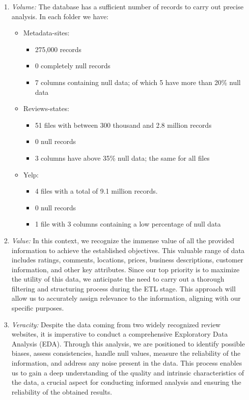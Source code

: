 \documentclass[12pt]{article}
\begin{document}
\begin{enumerate}
\begin{enumerate}
        \item \textit{Volume:} The database has a sufficient number of records to carry out precise analysis. In each folder we have:
        \begin{itemize}
            \item Metadata-sites:
            \begin{itemize}
                \item 275,000 records
                \item 0 completely null records
                \item 7 columns containing null data; of which 5 have more than 20\% null data
            \end{itemize}
            \item Reviews-states:
            \begin{itemize}
                \item 51 files with between 300 thousand and 2.8 million records
                \item 0 null records
                \item 3 columns have above 35\% null data; the same for all files
            \end{itemize}
            \item Yelp:
            \begin{itemize}
                \item 4 files with a total of 9.1 million records.
                \item 0 null records
                \item 1 file with 3 columns containing a low percentage of null data
            \end{itemize}
        \end{itemize}
        
        \item \textit{Value:} In this context, we recognize the immense value of all the provided information to achieve the established objectives. This valuable range of data includes ratings, comments, locations, prices, business descriptions, customer information, and other key attributes. Since our top priority is to maximize the utility of this data, we anticipate the need to carry out a thorough filtering and structuring process during the ETL stage. This approach will allow us to accurately assign relevance to the information, aligning with our specific purposes.
        
        \item \textit{Veracity:} Despite the data coming from two widely recognized review websites, it is imperative to conduct a comprehensive Exploratory Data Analysis (EDA). Through this analysis, we are positioned to identify possible biases, assess consistencies, handle null values, measure the reliability of the information, and address any noise present in the data. This process enables us to gain a deep understanding of the quality and intrinsic characteristics of the data, a crucial aspect for conducting informed analysis and ensuring the reliability of the obtained results.
    \end{enumerate}
\end{enumerate}
\end{document}
